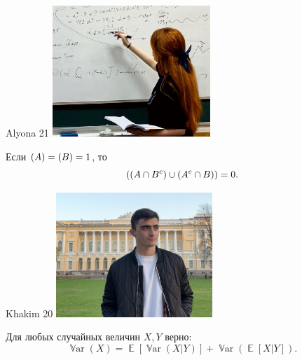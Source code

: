 \documentclass[12pt]{article}
\let\P\relax
\DeclareMathOperator{\P}{\mathbb{P}}
\DeclareMathOperator{\E}{\mathbb{E}}
\DeclareMathOperator{\Var}{\mathbb{V}ar}
\begin{document}
\newpage
\begin{minipage}{0.45\textwidth}
\begin{tinderf}{Alyona 21}
\includegraphics[width=\textwidth]{tinder-photo/alyona.png}

  

\begin{mybox}
Если $\P(A) = \P(B) = 1$, то 
\[
\P((A \cap B^c) \cup ( A^c \cap B))=0.
\]
\end{mybox}
\end{tinderf}
\end{minipage}
%
%
\begin{minipage}{0.45\textwidth}
\begin{tinderm}{Khakim 20}
\includegraphics[width=\textwidth]{tinder-photo/khakim.png}

  

\begin{mybox}
Для любых случайных величин $X,Y$ верно: 
\[
\Var(X) = \E[\Var(X | Y)] + \Var(\E[X | Y]).
\]
\end{mybox}
\end{tinderm}
\end{minipage}
\end{document}
